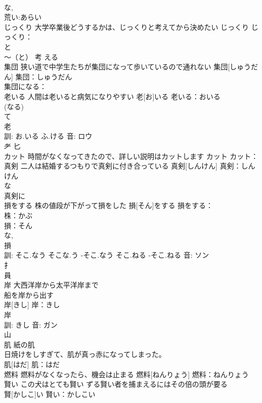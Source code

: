 \documentclass[8pt]{extreport}
\begin{document}
\begin{CJK}{UTF8}{min}
\\	な, 
\\	荒い:あらい
\\	じっくり	大学卒業後どうするかは、じっくりと考えてから決めたい	じっくり			じっくり：
\\	と 
\\	〜（と） 考 える			
\\	集団	狭い道で中学生たちが集団になって歩いているので通れない	集団[しゅうだん]			集団：しゅうだん
\\	集団になる：			
\\	老いる	人間は老いると病気になりやすい	老[お]いる			老いる：おいる
\\	(なる) 
\\	て		
\\	老 
\\	訓: お.いる ふ.ける 音: ロウ 
\\	耂 匕 
\\	カット	時間がなくなってきたので、詳しい説明はカットします	カット			カット：
\\	真剣	二人は結婚するつもりで真剣に付き合っている	真剣[しんけん]			真剣：しんけん
\\	な 
\\	真剣に
\\	損をする	株の値段が下がって損をした	損[そん]をする			損をする：
\\	株：かぶ
\\	損：そん
\\	な, 
\\	損 
\\	訓: そこ.なう そこな.う -そこ.なう そこ.ねる -そこ.ねる 音: ソン 
\\	扌 
\\	員 
\\	岸	大西洋岸から太平洋岸まで 
\\	船を岸から出す 
\\	岸[きし]			岸：きし
\\	岸 
\\	訓: きし 音: ガン 
\\	山 
\\	肌	紙の肌 
\\	日焼けをしすぎて、肌が真っ赤になってしまった。 
\\	肌[はだ]			肌：はだ
\\	燃料	燃料がなくなったら、機会は止まる	燃料[ねんりょう]			燃料：ねんりょう
\\	賢い	この犬はとても賢い ずる賢い者を捕まえるにはその倍の頭が要る 
\\	賢[かしこ]い			賢い：かしこい

\end{CJK}
\end{document}
